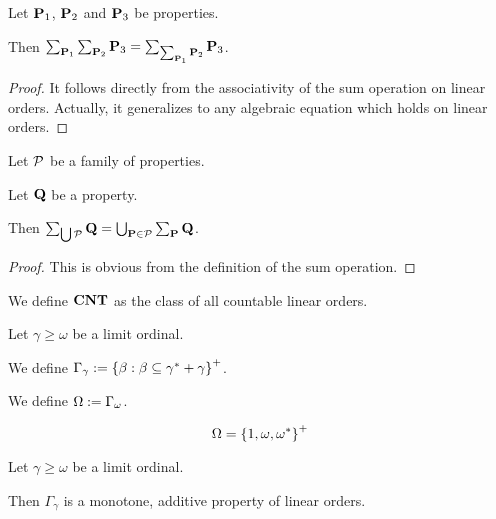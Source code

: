 \begin{lemma}
  Let $\mathbf{P}_1$, $\mathbf{P}_2$ and $\mathbf{P}_3$ be properties.

  Then $\sum_{\mathbf{P}_1}{\sum_{\mathbf{P}_2}{\mathbf{P}_3}} = \sum_{\sum_{\mathbf{P}_1}{\mathbf{P}_2}}{\mathbf{P}_3}$.
\end{lemma}

\begin{proof}
  It follows directly from the associativity of the sum operation on
  linear orders. Actually, it generalizes to any algebraic equation
  which holds on linear orders.
\end{proof}

\begin{lemma}
  Let $\mathcal{P}$ be a family of properties.

  Let $\mathbf{Q}$ be a property.

  Then $\sum_{\bigcup \mathcal{P}}{\mathbf{Q}} = \bigcup_{\mathbf{P} \in \mathcal{P}}{\sum_{\mathbf{P}}{\mathbf{Q}}}$.
\end{lemma}

\begin{proof}
  This is obvious from the definition of the sum operation.
\end{proof}

\begin{definition}
  We define $\mathbf{CNT}$ as the class of all countable linear orders.
\end{definition}


\begin{definition}
  Let $\gamma \ge \omega$ be a limit ordinal.

  We define $\Gamma_{\gamma} := \left\{ {\beta : \beta \subseteq \gamma^\ast + \gamma} \right\}^+$.

  We define $\Omega := \Gamma_{\omega}$.
\end{definition}

\begin{example}
  \[
    \Omega = \left\{ {1, \omega, \omega^\ast} \right\}^+
  \]
\end{example}

\begin{observation}
  Let $\gamma \ge \omega$ be a limit ordinal.

  Then $\Gamma_{\gamma}$ is a monotone, additive property of linear orders.
\end{observation}
